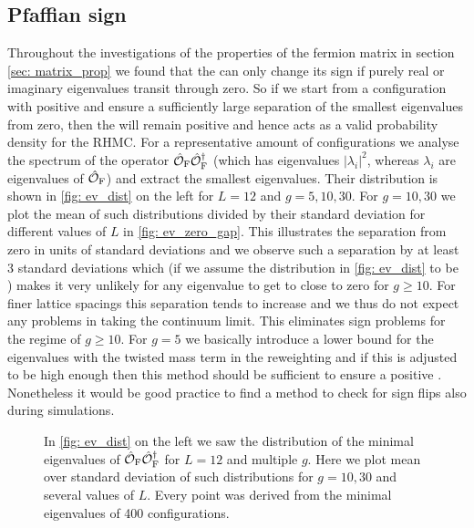 \subsection*{Pfaffian sign}
Throughout the investigations of the properties of the fermion matrix in section \ref{sec: matrix_prop} we found that the  can only change its sign if purely real or imaginary eigenvalues transit through zero. So if we start from a configuration with positive  and ensure a sufficiently large separation of the smallest eigenvalues from zero, then the  will remain positive and hence acts as a valid probability density for the RHMC. For a representative amount of configurations we analyse the spectrum of the operator $\hat{\mathcal{O}}_{\rm F}\hat{\mathcal{O}}_{\rm F}^{\dagger}$ (which has eigenvalues $\vert \lambda_{i}\vert^{2}$, whereas $\lambda_{i}$ are eigenvalues of $\hat{\mathcal{O}}_{\rm F}$) and extract the smallest eigenvalues. Their distribution is shown in \autoref{fig: ev_dist} on the left for $L=12$ and $g=5,10,30$. For $g=10,30$ we plot the mean of such distributions divided by their standard deviation for different values of $L$ in \autoref{fig: ev_zero_gap}. This illustrates the separation from zero in units of standard deviations and we observe such a separation by at least 3 standard deviations which (if we assume the distribution in \autoref{fig: ev_dist} to be ) makes it very unlikely for any eigenvalue to get to close to zero for $g\geq 10$. For finer lattice spacings this separation tends to increase and we thus do not expect any problems in taking the continuum limit. This eliminates sign problems for the regime of $g\geq 10$. For $g=5$ we basically introduce a lower bound for the eigenvalues with the twisted mass term in the reweighting and if this is adjusted to be high enough then this method should be sufficient to ensure a positive . Nonetheless it would be good practice to find a method to check for sign flips also during simulations.
%
%
%
\begin{figure}
\centering

\caption{In \autoref{fig: ev_dist} on the left we saw the distribution of the minimal eigenvalues of $\hat{\mathcal{O}}_{\rm F}\hat{\mathcal{O}}_{\rm F}^{\dagger}$ for $L=12$ and multiple $g$. Here we plot mean over standard deviation of such distributions for $g=10,30$ and several values of $L$. Every point was derived from the minimal eigenvalues of 400 configurations.
\label{fig: ev_zero_gap}}
\end{figure}